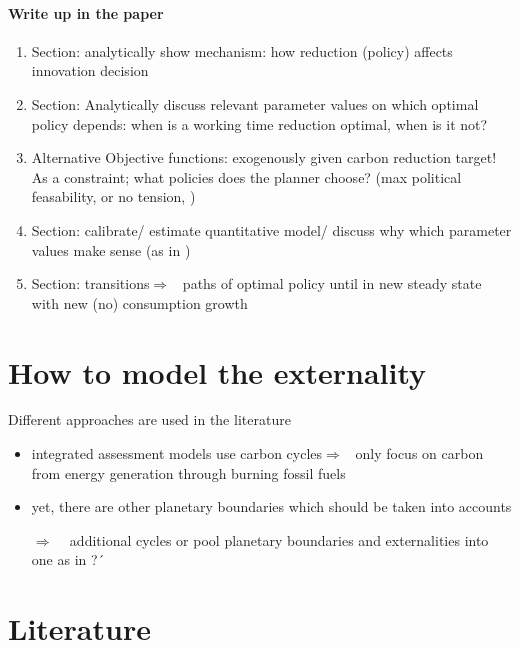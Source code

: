 \documentclass[12pt]{article}
\newcommand{\ar}{$\Rightarrow$ \ }
\begin{document}
\paragraph{Write up in the paper}
\begin{enumerate}
\item Section: analytically show mechanism: how reduction (policy) affects innovation decision
\item Section: Analytically discuss relevant parameter values on which optimal policy depends: when is a working time reduction optimal, when is it not?
\item Alternative Objective functions: exogenously given carbon reduction target! As a constraint; what policies does the planner choose? (max political feasability, or no tension, )
\item Section: calibrate/ estimate quantitative model/ discuss why which parameter values make sense (as in \cite{Jones2016LifeGrowth, Fried2018ClimateAnalysis})
\item Section: transitions\ar paths of optimal policy until in new steady state with new (no) consumption growth
\end{enumerate} 

\section{How to model the externality}
Different approaches are used in the literature
\begin{itemize}
\item integrated assessment models use carbon cycles\ar only focus on carbon from energy generation through burning fossil fuels
\item yet, there are other planetary boundaries \citep{Rockstrom2009AHumanity} which should be taken into accounts
\item[\ar] additional cycles or pool planetary boundaries and externalities into one as in \cite{Dasgupta2021}?´
\end{itemize}

\section{Literature}
\end{document}
